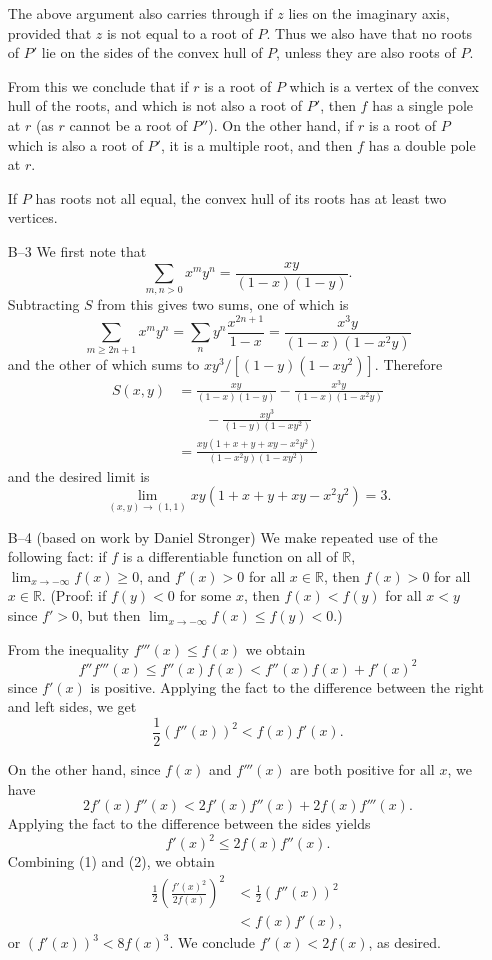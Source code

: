 \documentclass[amssymb,twocolumn,pra,10pt,aps]{revtex4-1}
\newcommand{\RR}{\mathbb{R}}
\begin{document}
\begin{itemize}
The above argument also carries through if $z$ lies on the
imaginary axis, provided that $z$ is not equal to a root of $P$. Thus we also have that
no roots of $P'$ lie on the sides of the convex hull of $P$, unless they are also
roots of $P$.

From this we conclude that if $r$ is a root of $P$ which is a vertex of the convex hull
of the roots, and
which is not also a root of $P'$,
then $f$ has a single pole at $r$ (as $r$ cannot be a root of $P''$).
On the other hand, if $r$ is a root of $P$ which is also a root of $P'$, it
is a multiple root, and then $f$ has a double pole at $r$.

If $P$ has roots not all equal, the convex hull of its roots has at least two
vertices.

\item[B--3]
We first note that
\[
\sum_{m,n > 0} x^m y^n = \frac{xy}{(1-x)(1-y)}.
\]
Subtracting $S$ from this gives two sums, one of which is
\[
\sum_{m \geq 2n+1} x^m y^n = \sum_n y^n \frac{x^{2n+1}}{1-x}
= \frac{x^3y}{(1-x)(1-x^2y)}
\]
and the other of which sums to $xy^3/[(1-y)(1-xy^2)]$. Therefore
\begin{align*}
S(x,y) &= \frac{xy}{(1-x)(1-y)} - \frac{x^3y}{(1-x)(1-x^2y)} \\
&\qquad - \frac{xy^3}{(1-y)(1-xy^2)} \\
&= \frac{xy(1+x+y+xy-x^2y^2)}{(1-x^2y)(1-xy^2)}
\end{align*}
and the desired limit is
\[
\lim_{(x,y) \to (1,1)} xy(1+x+y+xy-x^2y^2) = 3.
\]

\item[B--4]
\setcounter{equation}{0}
(based on work by Daniel Stronger)
We make repeated use of the following fact: if $f$ is a differentiable function on all of
$\RR$, $\lim_{x \to -\infty} f(x) \geq 0$, and $f'(x) > 0$ for all $x \in \RR$, then
$f(x) > 0$ for all $x \in \RR$. (Proof: if $f(y) < 0$ for some $x$, then $f(x)< f(y)$ for all
$x<y$ since $f'>0$, but then $\lim_{x \to -\infty} f(x) \leq f(y) < 0$.)

From the inequality $f'''(x) \leq f(x)$ we obtain
\[
f'' f'''(x) \leq f''(x) f(x) < f''(x) f(x) + f'(x)^2
\]
since $f'(x)$ is positive. Applying the fact to the difference between the right and left sides,
we get
\begin{equation}
\frac{1}{2} (f''(x))^2 < f(x) f'(x).
\end{equation}

On the other hand, since $f(x)$ and $f'''(x)$ are both positive for all $x$,
we have
\[
2f'(x) f''(x) < 2f'(x)f''(x) + 2f(x) f'''(x).
\]
Applying the fact to the difference between the sides yields
\begin{equation}
f'(x)^2 \leq 2f(x) f''(x).
\end{equation}
Combining (1) and (2), we obtain
\begin{align*}
\frac{1}{2} \left( \frac{f'(x)^2}{2f(x)} \right)^2
&< \frac{1}{2} (f''(x))^2 \\
&< f(x) f'(x),
\end{align*}
or $(f'(x))^3 < 8 f(x)^3$. We conclude $f'(x) < 2f(x)$, as desired.


\end{itemize}
\end{document}

